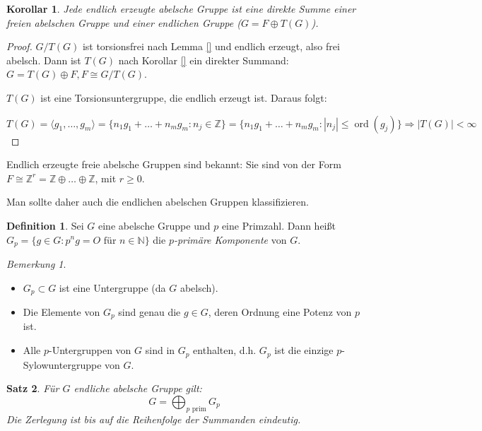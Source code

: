 \documentclass[12pt]{scrartcl} %
\DeclareMathOperator{\ord}{ord}
\newtheorem{thm}{Satz}[section]
\newtheorem{kor}[thm]{Korollar}
\theoremstyle{definition}
\newtheorem*{defn}{Definition}
\theoremstyle{remark}
\newtheorem*{nb}{Bemerkung}
\begin{document}
\begin{kor}
Jede endlich erzeugte abelsche Gruppe ist eine direkte Summe einer freien abelschen Gruppe und einer endlichen Gruppe ($G=F\oplus T(G)$).
\end{kor}

\begin{proof}
  $G/T(G)$ ist torsionsfrei nach Lemma \ref{} und endlich erzeugt, also frei abelsch. Dann ist $T(G)$ nach Korollar \ref{} ein direkter Summand: $G = T(G) \oplus F,F\cong G/T(G)$. %

$T(G)$ ist eine Torsionsuntergruppe, die endlich erzeugt ist. Daraus folgt: 

$T(G)=\langle g_{1}, \dots ,g_{m}\rangle=\{ n_{1}g_{1}+ \dots +n_{m}g_{m}:n_{j}\in \mathbb{Z}\}=\{ n_{1}g_{1}+\dots+n_{m}g_{m}:|n_{j}| \leq \ord(g_{j})\} \Rightarrow |T(G)| < \infty$ %
\end{proof}

Endlich erzeugte freie abelsche Gruppen sind bekannt: Sie sind von der Form $F\cong \mathbb{Z}^{r}=\mathbb{Z} \oplus \dots\oplus \mathbb{Z}$, mit $r\geq 0$.

Man sollte daher auch die endlichen abelschen Gruppen klassifizieren.

\begin{defn}
Sei $G$ eine abelsche Gruppe und $p$ eine Primzahl. 
Dann heißt $G_p=\{ g\in G:p^{n}g=O \text{ für } n \in \mathbb{N} \} $ 
die \emph{$p$-primäre Komponente} von $G$.
\end{defn}

\begin{nb}
\begin{itemize}
\item $G_p\subset G$ ist eine Untergruppe (da $G$ abelsch).
\item Die Elemente von $G_p$ sind genau die $g\in G$, deren Ordnung eine Potenz von $p$ ist.
\item Alle $p$-Untergruppen von $G$ sind in $G_p$ enthalten, d.h. $G_p$ ist die einzige $p$-Sylowuntergruppe von $G$.
\end{itemize}
\end{nb}

\begin{thm}
Für $G$ endliche abelsche Gruppe gilt:
\[ G=\bigoplus_{p \text{ prim}} G_{p} \]
Die Zerlegung ist bis auf die Reihenfolge der Summanden eindeutig.
\end{thm}
\end{document}
